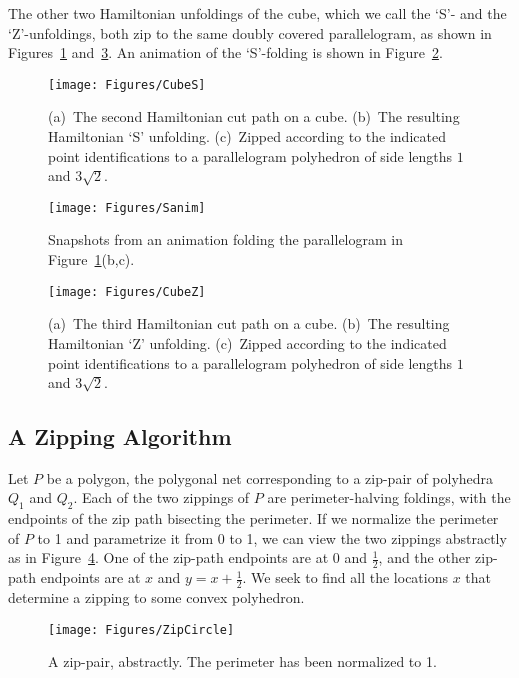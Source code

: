 \pdfoutput=1  \documentclass[]{article}
\newcommand{\figlab}[1]{\label{fig:#1}}
\newcommand{\seclab}[1]{\label{sec:#1}}
\newcommand{\figref}[1]{\ref{fig:#1}}
\begin{document}
The other two Hamiltonian unfoldings of the cube,
which we call the `S'- and the `Z'-unfoldings,
both zip to the same
doubly covered parallelogram, as shown in
Figures~\figref{CubeS} and~\figref{CubeZ}.
An animation of the `S'-folding is shown in Figure~\figref{Sanim}.
\begin{figure}[htbp]
\centering
\texttt{[image: Figures/CubeS]}
\caption{(a)~The second Hamiltonian cut path on a cube.
(b)~The resulting Hamiltonian `S' unfolding.
(c)~Zipped according to the indicated point identifications to a
parallelogram polyhedron of side lengths $1$ and $3 \sqrt{2}$.}
\figlab{CubeS}
\end{figure}
\begin{figure}[htbp]
\centering
\texttt{[image: Figures/Sanim]}
\caption{Snapshots from an animation folding the parallelogram in
Figure~\protect\figref{CubeS}(b,c).}
\figlab{Sanim}
\end{figure}
\begin{figure}[htbp]
\centering
\texttt{[image: Figures/CubeZ]}
\caption{(a)~The third  Hamiltonian cut path on a cube.
(b)~The resulting Hamiltonian `Z' unfolding.
(c)~Zipped according to the indicated point identifications to a
parallelogram polyhedron of side lengths $1$ and $3 \sqrt{2}$.}
\figlab{CubeZ}
\end{figure}




\subsection{A Zipping Algorithm}
\seclab{ZipIt}

Let $P$ be a  polygon, the polygonal net corresponding to a zip-pair of
polyhedra $Q_1$ and $Q_2$.
Each of the two zippings of $P$ are perimeter-halving foldings, with
the
endpoints of the zip path bisecting the perimeter.
If we normalize the perimeter of $P$ to 1 and parametrize
it from 0 to 1, we can view the two
zippings
abstractly as in Figure~\figref{ZipCircle}.
One of the zip-path endpoints are at 0 and $\frac{1}{2}$,
and the other zip-path endpoints are at $x$ and $y=x+\frac{1}{2}$.
We seek to find all the locations $x$ that determine a zipping to some
convex polyhedron.

\begin{figure}[htbp]
\centering
\texttt{[image: Figures/ZipCircle]}
\caption{A zip-pair, abstractly. The perimeter has been normalized to 1.}
\figlab{ZipCircle}
\end{figure}
\end{document}

